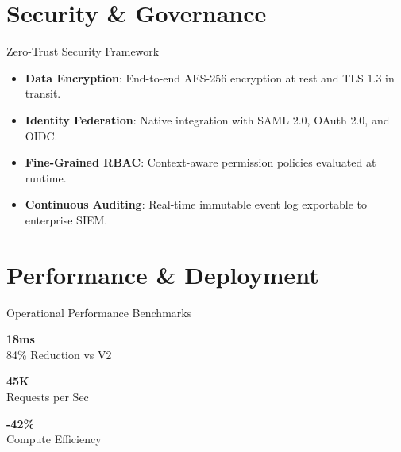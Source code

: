 \documentclass[style=fyma,palette=blue]{powerdot}
\begin{document}
\section{Security \& Governance}

\begin{slide}{Zero-Trust Security Framework}
\begin{itemize}
  \item \textbf{Data Encryption}: End-to-end AES-256 encryption at rest and TLS 1.3 in transit.
  \item \textbf{Identity Federation}: Native integration with SAML 2.0, OAuth 2.0, and OIDC.
  \item \textbf{Fine-Grained RBAC}: Context-aware permission policies evaluated at runtime.
  \item \textbf{Continuous Auditing}: Real-time immutable event log exportable to enterprise SIEM.
\end{itemize}
\end{slide}

\section{Performance \& Deployment}

\begin{slide}{Operational Performance Benchmarks}
\begin{minipage}[t]{0.31\textwidth}
\begin{tcolorbox}[title=P99 Latency,colframe=brandNavy,colback=white]
\centering
\Large\color{brandNavy}\textbf{18ms}\\[0.1cm]
\tiny\color{gray}84\% Reduction vs V2
\end{tcolorbox}
\end{minipage}%
\hfill
\begin{minipage}[t]{0.31\textwidth}
\begin{tcolorbox}[title=Throughput,colframe=brandTeal,colback=white]
\centering
\Large\color{brandTeal}\textbf{45K}\\[0.1cm]
\tiny\color{gray}Requests per Sec
\end{tcolorbox}
\end{minipage}%
\hfill
\begin{minipage}[t]{0.31\textwidth}
\begin{tcolorbox}[title=Cloud Cost,colframe=brandAccent,colback=white]
\centering
\Large\color{brandAccent}\textbf{-42\%}\\[0.1cm]
\tiny\color{gray}Compute Efficiency
\end{tcolorbox}
\end{minipage}
\end{slide}
\end{document}
